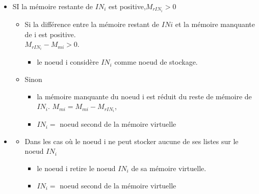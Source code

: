 \documentclass[10pt, c]{beamer}
\begin{document}
        	\begin{frame}{}
        	    \begin{itemize}
        	    \item SI la mémoire restante de $IN_i$ est positive,$ M_{rIN_{i}}>0$ 
        	    \begin{itemize}
        	        \item Si la différence entre la mémoire restant de $INi$ et la mémoire manquante de i est positive.\\
        	            $M_{rIN_{i}} - M_{mi} >0$.
        	            \begin{itemize}
        	                \item le noeud i considère $IN_i$ comme noeud de stockage.
        	            \end{itemize}
        	       \item Sinon
        	             \begin{itemize}
                          \item la mémoire manquante du noeud i est réduit du reste de mémoire de $IN_i$. $M_{mi} = M_{mi} - M_{rIN_i}$,
                          \item $IN_i = $ noeud second de la mémoire virtuelle
                     \end{itemize}
        	    \end{itemize}
        	    \end{itemize}
        	\end{frame}
            \begin{frame}{}
                \begin{itemize}
                \item[]\begin{itemize}
                     \item Dans les cas où le noeud i ne peut stocker aucune de ses listes sur le noeud $IN_i$
                     \begin{itemize}
                         \item le noeud i retire le noeud $IN_i$ de sa mémoire virtuelle. 
                        \item $IN_i = $ noeud second de la mémoire virtuelle
                     \end{itemize}
                \end{itemize}
                \end{itemize}
            \end{frame}
\end{document}
